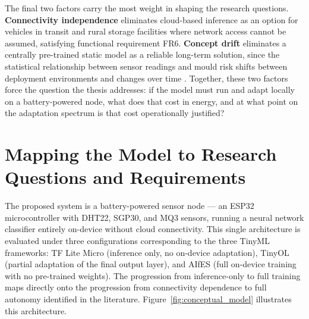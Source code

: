 The final two factors carry the most weight in shaping the research questions. \textbf{Connectivity independence} eliminates cloud-based inference as an option for vehicles in transit and rural storage facilities where network access cannot be assumed, satisfying functional requirement FR6. \textbf{Concept drift} eliminates a centrally pre-trained static model as a reliable long-term solution, since the statistical relationship between sensor readings and mould risk shifts between deployment environments and changes over time \cite{Bayram2022, Ilic2023}. Together, these two factors force the question the thesis addresses: if the model must run and adapt locally on a battery-powered node, what does that cost in energy, and at what point on the adaptation spectrum is that cost operationally justified?

\section{Mapping the Model to Research Questions and Requirements}

The proposed system is a battery-powered sensor node --- an ESP32 microcontroller with DHT22, SGP30, and MQ3 sensors, running a neural network classifier entirely on-device without cloud connectivity. This single architecture is evaluated under three configurations corresponding to the three TinyML frameworks: TF Lite Micro (inference only, no on-device adaptation), TinyOL (partial adaptation of the final output layer), and AIfES (full on-device training with no pre-trained weights). The progression from inference-only to full training maps directly onto the progression from connectivity dependence to full autonomy identified in the literature. Figure~\ref{fig:conceptual_model} illustrates this architecture.

